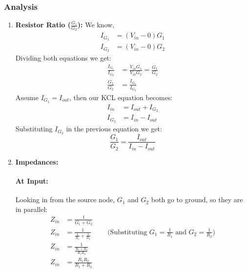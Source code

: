\subsubsection{Analysis}
\begin{enumerate}
  \item \textbf{Resistor Ratio (\(\frac{G_1}{G_2}\)):}
    We know,
    \begin{align*}
      I_{G_1} &= (V_{in} - 0)G_1 \\
      I_{G_2} &= (V_{in} - 0)G_2
    \end{align*}
    Dividing both equations we get:
    \begin{align*}
      \frac{I_{G_1}}{I_{G_2}} &= \frac{V_{in}G_1}{V_{in}G_2} = \frac{G_1}{G_2} \\
      \frac{G_1}{G_2} &= \frac{I_{G_1}}{I_{G_2}}
    \end{align*}
    Assume \(I_{G_1} = I_{out}\), then our KCL equation
    becomes:
    \begin{align*}
      I_{in} &= I_{out} + I_{G_2} \\
      I_{G_2} &= I_{in} - I_{out}
    \end{align*}
    Substituting \(I_{G_2}\) in the previous equation
    we get:
    \[
      \frac{G_1}{G_2} = \frac{I_{out}}{I_{in} - I_{out}}
    \]
  \item \textbf{Impedances:}
    \paragraph{At Input:} Looking in from the source node, \(G_1\) and
    \(G_2\) both go to ground, so they are in parallel:
      \begin{align*}
        Z_{in} &= \frac{1}{G_1 + G_2} \\
        Z_{in} &= \frac{1}{\frac{1}{R_1} + \frac{1}{R_2}} \hspace{1cm} \text{(Substituting \(G_1 = \frac{1}{R_1}\) and \(G_2 = \frac{1}{R_2}\))} \\
        Z_{in} &= \frac{1}{\frac{R_1 + R_2}{R_1 R_2}} \\
        Z_{in} &= \frac{R_1 R_2}{R_1 + R_2}
      \end{align*}

\end{enumerate}
